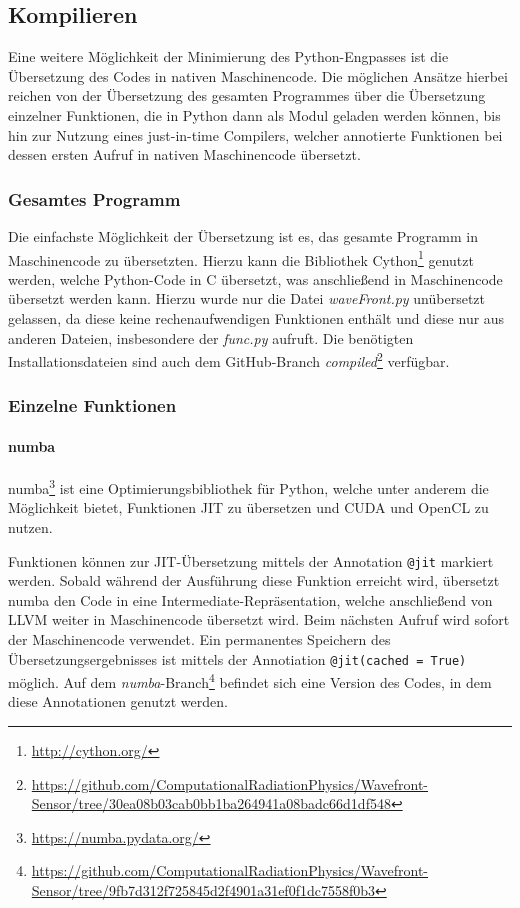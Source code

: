 \subsection{Kompilieren}

Eine weitere Möglichkeit der Minimierung des Python-Engpasses ist die Übersetzung des Codes in nativen Maschinencode. Die möglichen Ansätze hierbei reichen von der Übersetzung des gesamten Programmes über die Übersetzung einzelner Funktionen, die in Python dann als Modul geladen werden können, bis hin zur Nutzung eines just-in-time Compilers, welcher annotierte Funktionen bei dessen ersten Aufruf in nativen Maschinencode übersetzt. 

\subsubsection{Gesamtes Programm}

Die einfachste Möglichkeit der Übersetzung ist es, das gesamte Programm in Maschinencode zu übersetzten. Hierzu kann die Bibliothek Cython\footnote{\url{http://cython.org/}} genutzt werden, welche Python-Code in C übersetzt, was anschließend in Maschinencode übersetzt werden kann. Hierzu wurde nur die Datei \textit{waveFront.py} unübersetzt gelassen, da diese keine rechenaufwendigen Funktionen enthält und diese nur aus anderen Dateien, insbesondere der \textit{func.py} aufruft. Die benötigten Installationsdateien sind auch dem GitHub-Branch \textit{compiled}\footnote{\url{https://github.com/ComputationalRadiationPhysics/Wavefront-Sensor/tree/30ea08b03cab0bb1ba264941a08badc66d1df548}} verfügbar. 

\subsubsection{Einzelne Funktionen}

\paragraph{numba}

numba\footnote{\url{https://numba.pydata.org/}} ist eine Optimierungsbibliothek für Python, welche unter anderem die Möglichkeit bietet, Funktionen \gls{JIT} zu übersetzen und CUDA und OpenCL zu nutzen. 

Funktionen können zur \gls{JIT}-Übersetzung mittels der Annotation \texttt{@jit} markiert werden. Sobald während der Ausführung diese Funktion erreicht wird, übersetzt numba den Code in eine Intermediate-Repräsentation, welche anschließend von LLVM weiter in Maschinencode übersetzt wird. Beim nächsten Aufruf wird sofort der Maschinencode verwendet. Ein permanentes Speichern des Übersetzungsergebnisses ist mittels der Annotiation \texttt{@jit(cached = True)} möglich. Auf dem \textit{numba}-Branch\footnote{\url{https://github.com/ComputationalRadiationPhysics/Wavefront-Sensor/tree/9fb7d312f725845d2f4901a31ef0f1dc7558f0b3}} befindet sich eine Version des Codes, in dem diese Annotationen genutzt werden. 

